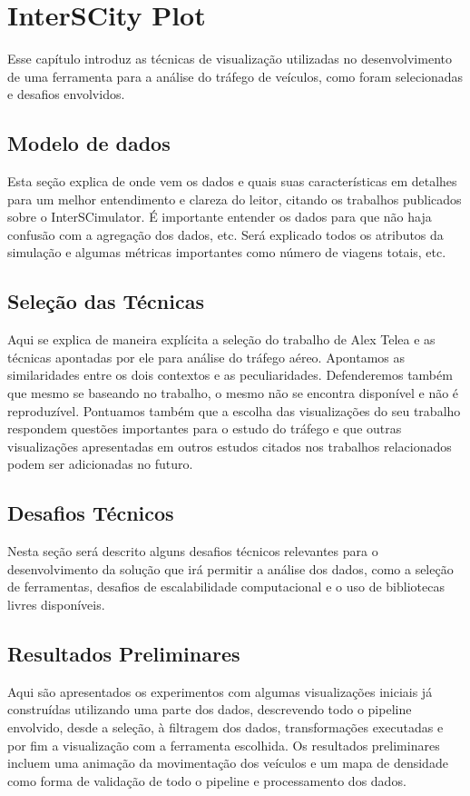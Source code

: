 \chapter{InterSCity Plot}
\label{cap:visualizacao}

Esse capítulo introduz as técnicas de visualização utilizadas no desenvolvimento
de uma ferramenta para a análise do tráfego de veículos, como foram selecionadas e desafios envolvidos.

\section{Modelo de dados}

Esta seção explica de onde vem os dados e quais suas características em detalhes
para um melhor entendimento e clareza do leitor, citando os trabalhos publicados sobre o InterSCimulator.
É importante entender os dados para que não haja confusão com a agregação dos dados, etc. Será
explicado todos os atributos da simulação e algumas métricas importantes como número
de viagens totais, etc.

\section{Seleção das Técnicas}

Aqui se explica de maneira explícita a seleção do trabalho de Alex Telea e as técnicas
apontadas por ele para análise do tráfego aéreo. Apontamos as similaridades entre
os dois contextos e as peculiaridades. Defenderemos também que mesmo se baseando
no trabalho, o mesmo não se encontra disponível e não é reproduzível. Pontuamos também
que a escolha das visualizações do seu trabalho respondem questões importantes
para o estudo do tráfego e que outras visualizações apresentadas em outros estudos citados
nos trabalhos relacionados podem ser adicionadas no futuro.

\section{Desafios Técnicos}

Nesta seção será descrito alguns desafios técnicos relevantes para o desenvolvimento da solução
que irá permitir a análise dos dados, como a seleção de ferramentas,
desafios de escalabilidade computacional e o uso de bibliotecas livres disponíveis.

\section{Resultados Preliminares}

Aqui são apresentados os experimentos com algumas visualizações iniciais já construídas
utilizando uma parte dos dados, descrevendo todo o pipeline envolvido, desde a seleção, à filtragem dos dados,
transformações executadas e por fim a visualização com a ferramenta escolhida.
Os resultados preliminares incluem uma animação da movimentação dos veículos e um mapa de densidade
como forma de validação de todo o pipeline e processamento dos dados.

